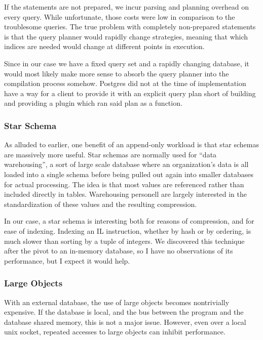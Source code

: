 If the statements are not prepared, we incur parsing and planning overhead on every query.
While unfortunate, those costs were low in comparison to the troublesome queries.
The true problem with completely non-prepared statements is that the query planner would rapidly change strategies, meaning that which indices are needed would change at different points in execution.

Since in our case we have a fixed query set and a rapidly changing database, it would most likely make more sense to absorb the query planner into the compilation process somehow.
Postgres did not at the time of implementation have a way for a client to provide it with an explicit query plan short of building and providing a plugin which ran said plan as a function.

\subsubsection{Star Schema}
As alluded to earlier, one benefit of an append-only workload is that star schemas are massively more useful.
Star schemas are normally used for ``data warehousing'', a sort of large scale database where an organization's data is all loaded into a single schema before being pulled out again into smaller databases for actual processing.
The idea is that most values are referenced rather than included directly in tables.
Warehousing personell are largely interested in the standardization of these values and the resulting compression.

In our case, a star schema is interesting both for reasons of compression, and for ease of indexing.
Indexing an IL instruction, whether by hash or by ordering, is much slower than sorting by a tuple of integers.
We discovered this technique after the pivot to an in-memory database, so I have no observations of its performance, but I expect it would help.

\subsubsection{Large Objects}
With an external database, the use of large objects becomes nontrivially expensive.
If the database is local, and the bus between the program and the database shared memory, this is not a major issue.
However, even over a local unix socket, repeated accesses to large objects can inhibit performance.

